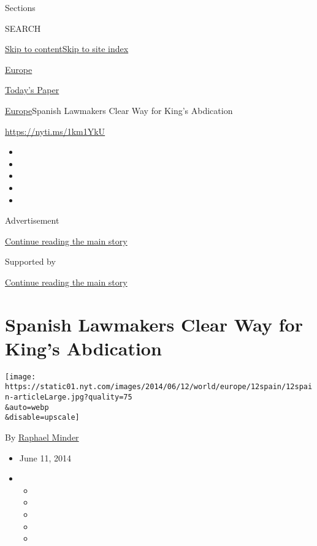 Sections

SEARCH

\protect\hyperlink{site-content}{Skip to
content}\protect\hyperlink{site-index}{Skip to site index}

\href{https://www.nytimes.com/section/world/europe}{Europe}

\href{https://myaccount.nytimes.com/auth/login?response_type=cookie\&client_id=vi}{}

\href{https://www.nytimes.com/section/todayspaper}{Today's Paper}

\href{/section/world/europe}{Europe}\textbar{}Spanish Lawmakers Clear
Way for King's Abdication

\url{https://nyti.ms/1km1YkU}

\begin{itemize}
\item
\item
\item
\item
\item
\end{itemize}

Advertisement

\protect\hyperlink{after-top}{Continue reading the main story}

Supported by

\protect\hyperlink{after-sponsor}{Continue reading the main story}

\hypertarget{spanish-lawmakers-clear-way-for-kings-abdication}{%
\section{Spanish Lawmakers Clear Way for King's
Abdication}\label{spanish-lawmakers-clear-way-for-kings-abdication}}

\texttt{[image: https://static01.nyt.com/images/2014/06/12/world/europe/12spain/12spain-articleLarge.jpg?quality=75\\\&auto=webp\\\&disable=upscale]}

By \href{http://www.nytimes.com/by/raphael-minder}{Raphael Minder}

\begin{itemize}
\item
  June 11, 2014
\item
  \begin{itemize}
  \item
  \item
  \item
  \item
  \item
  \end{itemize}
\end{itemize}

